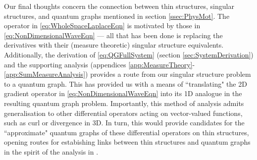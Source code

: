 Our final thoughts concern the connection between thin structures, singular structures, and quantum graphs mentioned in section \ref{ssec:PhysMot}.
The operator in \eqref{eq:WholeSpaceLaplaceEqn} is motivated by those in \eqref{eq:NonDimensionalWaveEqn} --- all that has been done is replacing the derivatives with their (measure theoretic) singular structure equivalents.
Additionally, the derivation of \eqref{eq:QGFullSystem} (section \ref{sec:SystemDerivation}) and the supporting analysis (appendices \ref{app:MeasureTheory}-\ref{app:SumMeasureAnalysis}) provides a route from our singular structure problem to a quantum graph.
This has provided us with a means of ``translating" the 2D gradient operator in \eqref{eq:NonDimensionalWaveEqn} into its 1D analogue in the resulting quantum graph problem.
Importantly, this method of analysis admits generalisation to other differential operators acting on vector-valued functions, such as curl or divergence in 3D.
In turn, this would provide candidates for  the ``approximate" quantum graphs of these differential operators on thin structures, opening routes for estabishing links between thin structures and quantum graphs in the spirit of the analysis in \cite{exner2005convergence, kuchment2001convergence}.
